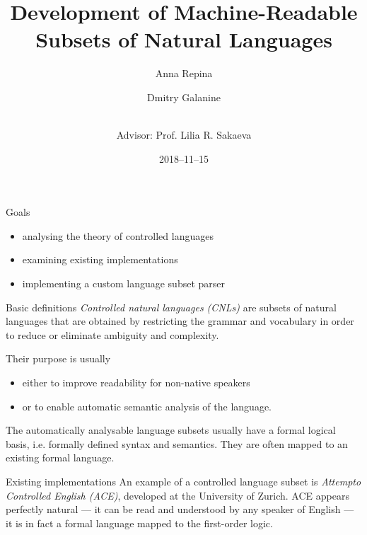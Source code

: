 \documentclass{beamer}
\begin{document}
\begin{frame}
\title{Development of Machine-Readable Subsets of Natural Languages}
\author{Anna Repina \and Dmitry Galanine \and \\[8mm]Advisor: Prof. Lilia R. Sakaeva }
\date{2018--11--15}
\maketitle
\end{frame}

\begin{frame}{Goals}
\begin{itemize}
\item analysing the theory of controlled languages
\item examining existing implementations
\item implementing a custom language subset parser
\end{itemize}
\end{frame}

\begin{frame}{Basic definitions}
\textit{Controlled natural languages (CNLs)} are subsets of natural languages that are obtained by restricting the grammar and
vocabulary in order to reduce or eliminate ambiguity and complexity. 

Their purpose is usually
\begin{itemize}
\item either to improve readability for non-native speakers
\item or to enable automatic semantic analysis of the language.
\end{itemize}
\end{frame}

\begin{frame}
The automatically analysable language subsets usually have a formal logical basis, i.e. formally defined syntax and semantics.
They are often mapped to an existing formal language.
\end{frame}

\begin{frame}{Existing implementations}
An example of a controlled language subset is \textit{Attempto Controlled English (ACE)}, developed at the University of Zurich.
ACE appears perfectly natural --- it can be read and understood by any speaker of English --- it is in fact a formal language
mapped to the first-order logic.
\end{frame}
\end{document}
